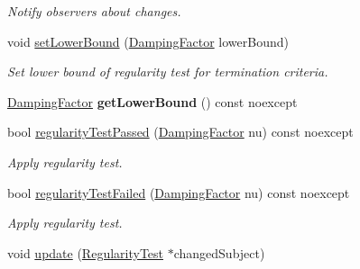 \begin{DoxyCompactItemize}
\begin{DoxyCompactList}\small\item\em Notify observers about changes. \end{DoxyCompactList}\item 
\hypertarget{classSpacy_1_1Mixin_1_1RegularityTest_a682ce022b0b5493e48f50f693ed64082}{void \hyperlink{classSpacy_1_1Mixin_1_1RegularityTest_a682ce022b0b5493e48f50f693ed64082}{set\-Lower\-Bound} (\hyperlink{classSpacy_1_1DampingFactor}{Damping\-Factor} lower\-Bound)}\label{classSpacy_1_1Mixin_1_1RegularityTest_a682ce022b0b5493e48f50f693ed64082}

\begin{DoxyCompactList}\small\item\em Set lower bound of regularity test for termination criteria. \end{DoxyCompactList}\item 
\hypertarget{classSpacy_1_1Mixin_1_1RegularityTest_a576995201badbfaee2064bf0d7749257}{\hyperlink{classSpacy_1_1DampingFactor}{Damping\-Factor} {\bfseries get\-Lower\-Bound} () const noexcept}\label{classSpacy_1_1Mixin_1_1RegularityTest_a576995201badbfaee2064bf0d7749257}

\item 
bool \hyperlink{classSpacy_1_1Mixin_1_1RegularityTest_acb6b3e8c76ebdbded0ec610959513caf}{regularity\-Test\-Passed} (\hyperlink{classSpacy_1_1DampingFactor}{Damping\-Factor} nu) const noexcept
\begin{DoxyCompactList}\small\item\em Apply regularity test. \end{DoxyCompactList}\item 
bool \hyperlink{classSpacy_1_1Mixin_1_1RegularityTest_aeb1a3b051bafc9da9be1df354c652812}{regularity\-Test\-Failed} (\hyperlink{classSpacy_1_1DampingFactor}{Damping\-Factor} nu) const noexcept
\begin{DoxyCompactList}\small\item\em Apply regularity test. \end{DoxyCompactList}\item 
\hypertarget{classSpacy_1_1Mixin_1_1RegularityTest_a1a6191e20f84025cec8b10ec63ab94ac}{void \hyperlink{classSpacy_1_1Mixin_1_1RegularityTest_a1a6191e20f84025cec8b10ec63ab94ac}{update} (\hyperlink{classSpacy_1_1Mixin_1_1RegularityTest_a548d9d45c31c7833266bd3b20dc1aa7e}{Regularity\-Test} $\ast$changed\-Subject)}\label{classSpacy_1_1Mixin_1_1RegularityTest_a1a6191e20f84025cec8b10ec63ab94ac}


\end{DoxyCompactItemize}
